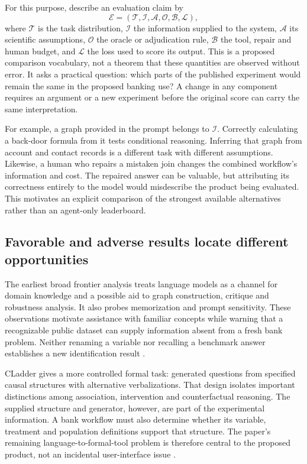 For this purpose, describe an evaluation claim by
\begin{equation}
 \mathcal E=(\mathcal T,\mathcal I,\mathcal A,\mathcal O,\mathcal B,\mathcal L),
 \label{exec13:frontier-claim}
\end{equation}
where $\mathcal T$ is the task distribution, $\mathcal I$ the information
supplied to the system, $\mathcal A$ its scientific assumptions, $\mathcal O$
the oracle or adjudication rule, $\mathcal B$ the tool, repair and human budget,
and $\mathcal L$ the loss used to score its output. This is a proposed
comparison vocabulary, not a theorem that these quantities are observed without
error. It asks a practical question: which parts of the published experiment
would remain the same in the proposed banking use? A change in any component
requires an argument or a new experiment before the original score can carry
the same interpretation.

For example, a graph provided in the prompt belongs to $\mathcal I$. Correctly
calculating a back-door formula from it tests conditional reasoning. Inferring
that graph from account and contact records is a different task with different
assumptions. Likewise, a human who repairs a mistaken join changes the combined
workflow's information and cost. The repaired answer can be valuable, but
attributing its correctness entirely to the model would misdescribe the product
being evaluated. This motivates an explicit comparison of the strongest
available alternatives rather than an agent-only leaderboard.

\subsection{Favorable and adverse results locate different opportunities}

The earliest broad frontier analysis treats language models as a channel for
domain knowledge and a possible aid to graph construction, critique and
robustness analysis. It also probes memorization and prompt sensitivity. These
observations motivate assistance with familiar concepts while warning that a
recognizable public dataset can supply information absent from a fresh bank
problem. Neither renaming a variable nor recalling a benchmark answer
establishes a new identification result \cite{v12_la_2305_00050}.

CLadder gives a more controlled formal task: generated questions from specified
causal structures with alternative verbalizations. That design isolates
important distinctions among association, intervention and counterfactual
reasoning. The supplied structure and generator, however, are part of the
experimental information. A bank workflow must also determine whether its
variable, treatment and population definitions support that structure. The
paper's remaining language-to-formal-tool problem is therefore central to the
proposed product, not an incidental user-interface issue
\cite{v12_la_2312_04350}.

